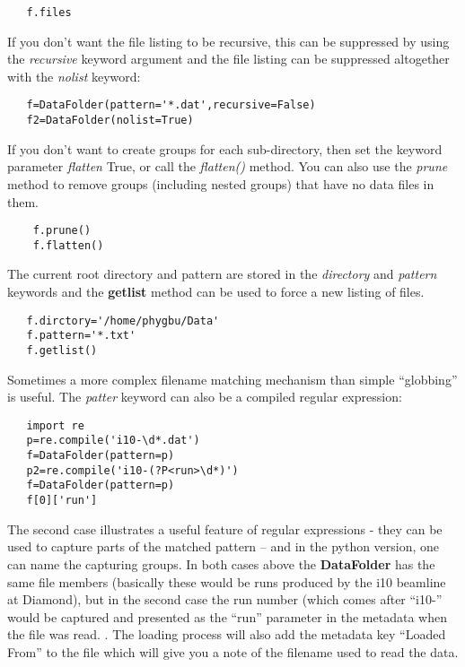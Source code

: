 \documentclass[a4paper,11pt]{scrartcl}
\begin{document}
\begin{lstlisting}
   f.files
\end{lstlisting}


If you don't want the file listing to be recursive, this can be suppressed by using the \textit{recursive} keyword argument and the file listing can be suppressed altogether with the \textit{nolist} keyword:

\begin{lstlisting}
   f=DataFolder(pattern='*.dat',recursive=False)
   f2=DataFolder(nolist=True)
\end{lstlisting}

If you don't want to create groups for each sub-directory, then set the keyword parameter \textit{flatten} True, or call the \textit{flatten()} method. You can also use the \textit{prune} method to remove groups (including nested groups) that have no data files in them.

\begin{lstlisting}
	f.prune()
	f.flatten()
\end{lstlisting}

The current root directory and pattern are stored in the \textit{directory} and \textit{pattern} keywords and the \textbf{getlist} method can be used to force a new listing of files.

\begin{lstlisting}
   f.dirctory='/home/phygbu/Data'
   f.pattern='*.txt'
   f.getlist()
\end{lstlisting}

Sometimes a more complex filename matching mechanism than simple ``globbing'' is useful. The \textit{patter} keyword can also be a compiled regular expression:

\begin{lstlisting}
   import re
   p=re.compile('i10-\d*.dat')
   f=DataFolder(pattern=p)
   p2=re.compile('i10-(?P<run>\d*)')
   f=DataFolder(pattern=p)
   f[0]['run']
\end{lstlisting}

The second case illustrates a useful feature of regular expressions - they can be used to capture parts of the matched pattern -- and in the python version, one can name the capturing groups. In both cases above the \textbf{DataFolder} has the same file members (basically these would be runs produced by the i10 beamline at Diamond), but in the second case the run number (which comes after ``i10-'' would be captured and presented as the ``run'' parameter in the metadata when the file was read. . The loading process will also add the metadata key ``Loaded From'' to the file which will give you a note of the filename used to read the data.
\end{document}
